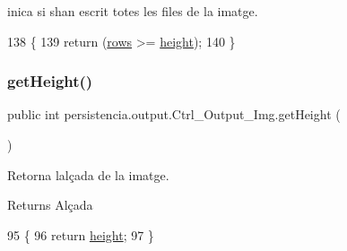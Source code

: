 inica si s\textquotesingle{}han escrit totes les files de la imatge. 


\begin{DoxyCode}
138                               \{
139         \textcolor{keywordflow}{return} (\hyperlink{classpersistencia_1_1output_1_1Ctrl__Output__Img_a586ee8128a26b6786471e040a705bdbc}{rows} >= \hyperlink{classpersistencia_1_1output_1_1Ctrl__Output__Img_a1d7bc52c64c79e8545ae6d1ae8b9ee2e}{height});
140     \}
\end{DoxyCode}
\mbox{\label{classpersistencia_1_1output_1_1Ctrl__Output__Img_a736bcf38410d875d9b4a17fd2a95cc4d}} 
\subsubsection{\texorpdfstring{get\+Height()}{getHeight()}}
{\footnotesize\ttfamily public int persistencia.\+output.\+Ctrl\+\_\+\+Output\+\_\+\+Img.\+get\+Height (\begin{DoxyParamCaption}{ }\end{DoxyParamCaption})\hspace{0.3cm}{\ttfamily [inline]}}



Retorna l\textquotesingle{}alçada de la imatge. 

\begin{DoxyReturn}{Returns}
Alçada 
\end{DoxyReturn}

\begin{DoxyCode}
95                            \{
96         \textcolor{keywordflow}{return} \hyperlink{classpersistencia_1_1output_1_1Ctrl__Output__Img_a1d7bc52c64c79e8545ae6d1ae8b9ee2e}{height};
97     \}
\end{DoxyCode}
\mbox{\label{classpersistencia_1_1output_1_1Ctrl__Output__Img_ab6e88e466e6b7d7d847be2ac9c26c529}} 
